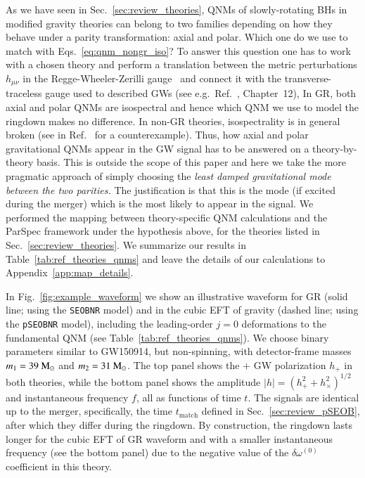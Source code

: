 \documentclass[twocolumn,
               prd,
               aps,
               superscriptaddress,
               tightenlines,
               nofootinbib,
               eqsecnum,
               amsfonts,
               amsmath,
               longbibliography]{revtex4-1}
\newcommand{\pSEOB}{\texttt{pSEOBNR}}
\newcommand{\msun}{~{\rm M}_{\odot}}
\begin{document}
As we have seen in Sec.~\ref{sec:review_theories}, QNMs of slowly-rotating
BHs in modified gravity theories can belong to two families depending on how
they behave under a parity transformation: axial and polar. Which one do
we use to match with Eqs.~\eqref{eq:qnm_nongr_iso}?
%
To answer this question one has to work with a chosen theory and perform a
translation between the metric perturbations $h_{\mu\nu}$ in the
Regge-Wheeler-Zerilli gauge~\cite{Regge:1957td,Zerilli:1970se} and connect it with the transverse-traceless gauge
used to described GWs (see e.g.~Ref.~\cite{Maggiore:2018sht}, Chapter~12),
%
In GR, both axial and polar QNMs are isospectral and hence which QNM we use to
model the ringdown makes no difference.
%
In non-GR theories, isospectrality is in general broken (see
in Ref.~\cite{Hui:2021cpm} for a counterexample).
%
Thus, how axial and polar gravitational QNMs appear in the GW signal has to be
answered on a theory-by-theory basis.
%
This is outside the scope of this paper and here we take the more pragmatic
approach of simply choosing the \emph{least damped gravitational mode between
the two parities.}
%
The justification is that this is the mode (if excited during the merger) which is
the most likely to appear in the signal.
We performed the mapping between theory-specific QNM calculations and the ParSpec framework
under the hypothesis above, for the theories listed in Sec.~\ref{sec:review_theories}.
%
We summarize our results in Table~\ref{tab:ref_theories_qnms} and
leave the details of our calculations to Appendix~\ref{app:map_details}.

In Fig.~\ref{fig:example_waveform} we show an illustrative waveform for GR (solid line; using the \texttt{SEOBNR} model) and in the cubic EFT of gravity (dashed line; using the \pSEOB{} model),
including the leading-order $j = 0$ deformations to the fundamental QNM (see Table~\ref{tab:ref_theories_qnms}).
%
We choose binary parameters similar to GW150914,  but non-spinning, with detector-frame masses 
$m_1 = 39\msun$ and $m_2 = 31\msun$. 
%
The top panel shows the $+$ GW polarization $h_{+}$ in both theories,
while the bottom panel shows the amplitude $|h| = (h_{+}^2 + h_{\times}^2)^{1/2}$
and instantaneous frequency $f$, all as functions of time $t$.
%
The signals are identical up to the merger, specifically, the time $t_\textrm{match}$
defined in Sec.~\ref{sec:review_pSEOB}, after which they differ during the ringdown.
%
By construction, the ringdown lasts longer for the cubic EFT of GR waveform and
with a smaller instantaneous frequency (see the bottom panel) due to the negative value of the
$\delta\omega^{(0)}$ coefficient in this theory.
\end{document}
